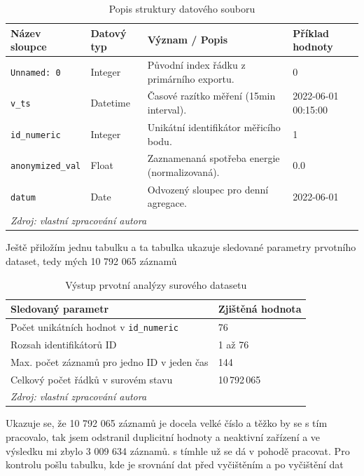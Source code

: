 \begin{table}[htbp]
\centering
\caption{Popis struktury datového souboru}
\label{tab:data_description}
\begin{tabular}{@{}llll@{}}
\toprule
\textbf{Název sloupce} & \textbf{Datový typ} & \textbf{Význam / Popis} & \textbf{Příklad hodnoty} \\ \midrule
\texttt{Unnamed: 0}    & Integer             & Původní index řádku z primárního exportu. & 0 \\
\texttt{v\_ts}         & Datetime            & Časové razítko měření (15min interval). & 2022-06-01 00:15:00 \\
\texttt{id\_numeric}   & Integer             & Unikátní identifikátor měřicího bodu. & 1 \\
\texttt{anonymized\_val} & Float             & Zaznamenaná spotřeba energie (normalizovaná). & 0.0 \\
\texttt{datum}         & Date                & Odvozený sloupec pro denní agregace. & 2022-06-01 \\ \bottomrule
\multicolumn{3}{l}{\textit{Zdroj: vlastní zpracování autora}} 
\end{tabular}
\end{table}

Ještě přiložím jednu tabulku a ta tabulka ukazuje sledované parametry  prvotního dataset, tedy mých 10 792 065 záznamů 

\begin{table}[htbp]
\centering
\caption{Výstup prvotní analýzy surového datasetu }
\label{tab:raw_data_check}
\begin{tabular}{@{}ll@{}}
\toprule
\textbf{Sledovaný parametr} & \textbf{Zjištěná hodnota} \\ \midrule
Počet unikátních hodnot v \texttt{id\_numeric} & 76 \\
Rozsah identifikátorů ID & 1 až 76 \\
Max. počet záznamů pro jedno ID v jeden čas & 144 \\
Celkový počet řádků v surovém stavu & 10\,792\,065 \\ \bottomrule
\bottomrule
\multicolumn{3}{l}{\textit{Zdroj: vlastní zpracování autora}} \\
\end{tabular}
\end{table}

Ukazuje se, že  10 792 065 záznamů je docela velké číslo a těžko by se s tím pracovalo, tak jsem odstranil duplicitní hodnoty a neaktivní zařízení a ve výsledku mi zbylo 3 009 634 záznamů. s tímhle už se dá v pohodě pracovat. Pro kontrolu pošlu tabulku, kde je srovnání dat před vyčištěním a po vyčištění dat 


